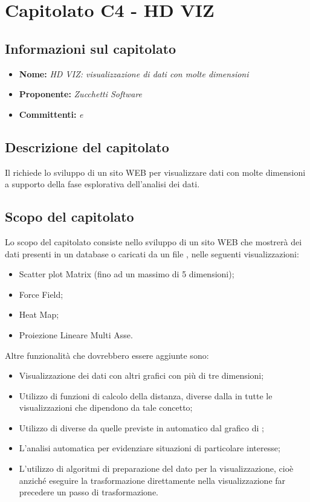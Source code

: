\section{Capitolato C4 - HD VIZ}\label{C4}
\subsection{Informazioni sul capitolato}
\begin{itemize}
	\item \textbf{Nome:} \textit{HD VIZ: visualizzazione di dati con molte dimensioni}
	\item \textbf{Proponente:} \textit{Zucchetti Software}
	\item \textbf{Committenti:} \textit{\VT{} e \CR{}}
\end{itemize}

\subsection{Descrizione del capitolato}
Il  richiede lo sviluppo di un sito WEB per visualizzare dati con molte dimensioni a supporto della fase esplorativa dell'analisi dei dati.

\subsection{Scopo del capitolato}
Lo scopo del capitolato consiste nello sviluppo di un sito WEB che mostrerà dei dati presenti in un database o caricati da un file , nelle seguenti visualizzazioni:
\begin{itemize}
	\item Scatter plot Matrix (fino ad un massimo di 5 dimensioni);
	\item Force Field;
	\item Heat Map;
	\item Proiezione Lineare Multi Asse.
\end{itemize}
Altre funzionalità che dovrebbero essere aggiunte sono:
\begin{itemize}
	\item Visualizzazione dei dati con altri grafici con più di tre dimensioni;
	\item Utilizzo di funzioni di calcolo della distanza, diverse dalla  in tutte le visualizzazioni che dipendono da tale concetto;
	\item Utilizzo di  diverse da quelle previste in automatico dal grafico  di ;
	\item L'analisi automatica per evidenziare situazioni di particolare interesse;
	\item L'utilizzo di algoritmi di preparazione del dato per la visualizzazione, cioè anziché eseguire la trasformazione direttamente nella visualizzazione far precedere un passo di trasformazione.
\end{itemize}

